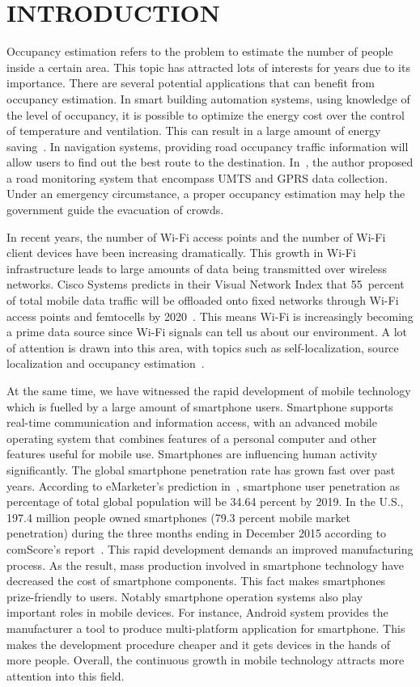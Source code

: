 \chapter[INTRODUCTION]{INTRODUCTION}

Occupancy estimation refers to the problem to estimate the number of people inside a certain area. 
This topic has attracted lots of interests for years due to its importance.
There are several potential applications that can benefit from occupancy estimation.
In smart building automation systems, using knowledge of the level of occupancy, it is possible to optimize the energy cost over the control of temperature and ventilation.
This can result in a large amount of energy saving~\cite{Nguyen2013244,Balaji:2013:SOB:2517351.2517370}.
In navigation systems, providing road occupancy traffic information will allow users to find out the best route to the destination.
In~\cite{5073548}, the author proposed a road monitoring system that encompass UMTS and GPRS data collection.
Under an emergency circumstance, a proper occupancy estimation may help the government guide the evacuation of crowds. 

In recent years, the number of Wi-Fi access points and the number of Wi-Fi client devices have been increasing dramatically.
This growth in Wi-Fi infrastructure leads to large amounts of data being transmitted over wireless networks.
Cisco Systems predicts in their Visual Network Index that 55~percent of total mobile data traffic will be offloaded onto fixed networks through Wi-Fi access points and femtocells by 2020~\cite{CiscoVNI2016}.
This means Wi-Fi is increasingly becoming a prime data source since Wi-Fi signals can tell us about our environment.
A lot of attention is drawn into this area, with topics such as self-localization, source localization and occupancy estimation~\cite{2461394,6197192}.

At the same time, we have witnessed the rapid development of mobile technology which is fuelled by a large amount of smartphone users.
Smartphone supports real-time communication and information access, with an advanced mobile operating system that combines features of a personal computer and other features useful for mobile use.
Smartphones are influencing human activity significantly.
The global smartphone penetration rate has grown fast over past years.
According to eMarketer's prediction in~\cite{emarketer}, smartphone user penetration as percentage of total global population will be 34.64 percent by 2019.
In the U.S., 197.4 million people owned smartphones (79.3 percent mobile market penetration) during the three months ending in December 2015 according to comScore's report~\cite{comscore}.
This rapid development demands an improved manufacturing process.
As the result, mass production involved in smartphone technology have decreased the cost of smartphone components.
This fact makes smartphones prize-friendly to users.
Notably smartphone operation systems also play important roles in mobile devices.
For instance, Android system provides the manufacturer a tool to produce multi-platform application for smartphone.
This makes the development procedure cheaper and it gets devices in the hands of more people.
Overall, the continuous growth in mobile technology attracts more attention into this field.


